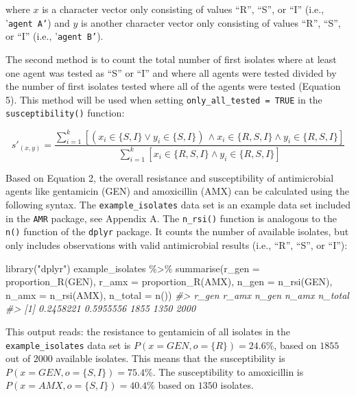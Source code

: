 \documentclass[
]{book}
\newenvironment{Shaded}{\begin{snugshade}}{\end{snugshade}}
\newcommand{\AttributeTok}[1]{\textcolor[rgb]{0.77,0.63,0.00}{#1}}
\newcommand{\CommentTok}[1]{\textcolor[rgb]{0.56,0.35,0.01}{\textit{#1}}}
\newcommand{\FunctionTok}[1]{\textcolor[rgb]{0.00,0.00,0.00}{#1}}
\newcommand{\NormalTok}[1]{#1}
\newcommand{\SpecialCharTok}[1]{\textcolor[rgb]{0.00,0.00,0.00}{#1}}
\newcommand{\StringTok}[1]{\textcolor[rgb]{0.31,0.60,0.02}{#1}}
\begin{document}
where \(x\) is a character vector only consisting of values ``R'', ``S'', or ``I'' (i.e., '\texttt{agent\ A’}) and \(y\) is another character vector only consisting of values ``R'', ``S'', or ``I'' (i.e., '\texttt{agent\ B’}).

The second method is to count the total number of first isolates where at least one agent was tested as ``S'' or ``I'' and where all agents were tested divided by the number of first isolates tested where all of the agents were tested (Equation 5). This method will be used when setting \texttt{only\_all\_tested\ =\ TRUE} in the \texttt{susceptibility()} function:

\[s'_{(x, y)} = \frac{\sum_{i=1}^k [(x_i \in \{S,I\} \lor y_i \in \{S,I\}) \, \land x_i \in \{R,S,I\} \land y_i \in \{R,S,I\}]}{\sum_{i=1}^k [x_i \in \{R,S,I\} \land y_i \in \{R,S,I\}]}\]

Based on Equation 2, the overall resistance and susceptibility of antimicrobial agents like gentamicin (GEN) and amoxicillin (AMX) can be calculated using the following syntax. The \texttt{example\_isolates} data set is an example data set included in the \texttt{AMR} package, see Appendix A. The \texttt{n\_rsi()} function is analogous to the \texttt{n()} function of the \texttt{dplyr} package. It counts the number of available isolates, but only includes observations with valid antimicrobial results (i.e., ``R'', ``S'', or ``I''):

\begin{Shaded}
\begin{Highlighting}[]
\FunctionTok{library}\NormalTok{(}\StringTok{"dplyr"}\NormalTok{)}
\NormalTok{example\_isolates }\SpecialCharTok{\%\textgreater{}\%}
   \FunctionTok{summarise}\NormalTok{(}\AttributeTok{r\_gen =} \FunctionTok{proportion\_R}\NormalTok{(GEN),}
             \AttributeTok{r\_amx =} \FunctionTok{proportion\_R}\NormalTok{(AMX),}
             \AttributeTok{n\_gen =} \FunctionTok{n\_rsi}\NormalTok{(GEN),}
             \AttributeTok{n\_amx =} \FunctionTok{n\_rsi}\NormalTok{(AMX),}
             \AttributeTok{n\_total =} \FunctionTok{n}\NormalTok{())}
\CommentTok{\#\textgreater{}         r\_gen     r\_amx n\_gen n\_amx n\_total}
\CommentTok{\#\textgreater{} [1] 0.2458221 0.5955556  1855  1350    2000}
\end{Highlighting}
\end{Shaded}

This output reads: the resistance to gentamicin of all isolates in the \texttt{example\_isolates} data set is \(P{(x = GEN, o = \{R\})} = 24.6\%\), based on \(1855\) out of \(2000\) available isolates. This means that the susceptibility is \(P{(x = GEN, o = \{S,I\})} = 75.4\%\). The susceptibility to amoxicillin is \(P{(x = AMX, o = \{S,I\})} = 40.4\%\) based on \(1350\) isolates.
\end{document}
